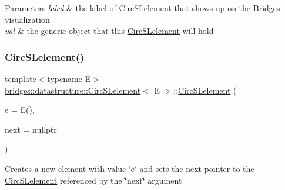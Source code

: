 \begin{DoxyParams}{Parameters}
{\em label} & the label of \mbox{\hyperlink{classbridges_1_1datastructure_1_1_circ_s_lelement}{Circ\+S\+Lelement}} that shows up on the \mbox{\hyperlink{classbridges_1_1_bridges}{Bridges}} visualization \\
\hline
{\em val} & the generic object that this \mbox{\hyperlink{classbridges_1_1datastructure_1_1_circ_s_lelement}{Circ\+S\+Lelement}} will hold \\
\hline
\end{DoxyParams}
\mbox{\label{classbridges_1_1datastructure_1_1_circ_s_lelement_aaedaa1d980bd5a66511b57cd20a8d94c}} 
\subsubsection{\texorpdfstring{Circ\+S\+Lelement()}{CircSLelement()}\hspace{0.1cm}{\footnotesize\ttfamily [3/4]}}
{\footnotesize\ttfamily template$<$typename E$>$ \\
\mbox{\hyperlink{classbridges_1_1datastructure_1_1_circ_s_lelement}{bridges\+::datastructure\+::\+Circ\+S\+Lelement}}$<$ E $>$\+::\mbox{\hyperlink{classbridges_1_1datastructure_1_1_circ_s_lelement}{Circ\+S\+Lelement}} (\begin{DoxyParamCaption}\item[{E}]{e = {\ttfamily E()},  }\item[{\mbox{\hyperlink{classbridges_1_1datastructure_1_1_circ_s_lelement}{Circ\+S\+Lelement}}$<$ E $>$ $\ast$}]{next = {\ttfamily nullptr} }\end{DoxyParamCaption})\hspace{0.3cm}{\ttfamily [inline]}}

Creates a new element with value \char`\"{}e\char`\"{} and sets the next pointer to the \mbox{\hyperlink{classbridges_1_1datastructure_1_1_circ_s_lelement}{Circ\+S\+Lelement}} referenced by the \char`\"{}next\char`\"{} argument


